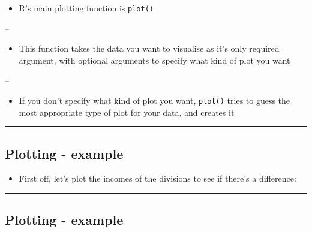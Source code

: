 \documentclass[]{article}
\newenvironment{Shaded}{\begin{snugshade}}{\end{snugshade}}
\newcommand{\DataTypeTok}[1]{\textcolor[rgb]{0.13,0.29,0.53}{#1}}
\newcommand{\KeywordTok}[1]{\textcolor[rgb]{0.13,0.29,0.53}{\textbf{#1}}}
\newcommand{\NormalTok}[1]{#1}
\newcommand{\OperatorTok}[1]{\textcolor[rgb]{0.81,0.36,0.00}{\textbf{#1}}}
\providecommand{\tightlist}{%
  \setlength{\itemsep}{0pt}\setlength{\parskip}{0pt}}
\begin{document}
\begin{itemize}
\tightlist
\item
  R's main plotting function is \texttt{plot()}
\end{itemize}

--

\begin{itemize}
\tightlist
\item
  This function takes the data you want to visualise as it's only
  required argument, with optional arguments to specify what kind of
  plot you want
\end{itemize}

--

\begin{itemize}
\tightlist
\item
  If you don't specify what kind of plot you want, \texttt{plot()} tries
  to guess the most appropriate type of plot for your data, and creates
  it
\end{itemize}

\begin{center}\rule{0.5\linewidth}{\linethickness}\end{center}

\hypertarget{plotting---example}{%
\subsection{Plotting - example}\label{plotting---example}}

\begin{itemize}
\tightlist
\item
  First off, let's plot the incomes of the divisions to see if there's a
  difference:
\end{itemize}

\begin{Shaded}
\end{Shaded}

\begin{center}\rule{0.5\linewidth}{\linethickness}\end{center}

\hypertarget{plotting---example-1}{%
\subsection{Plotting - example}\label{plotting---example-1}}
\end{document}
